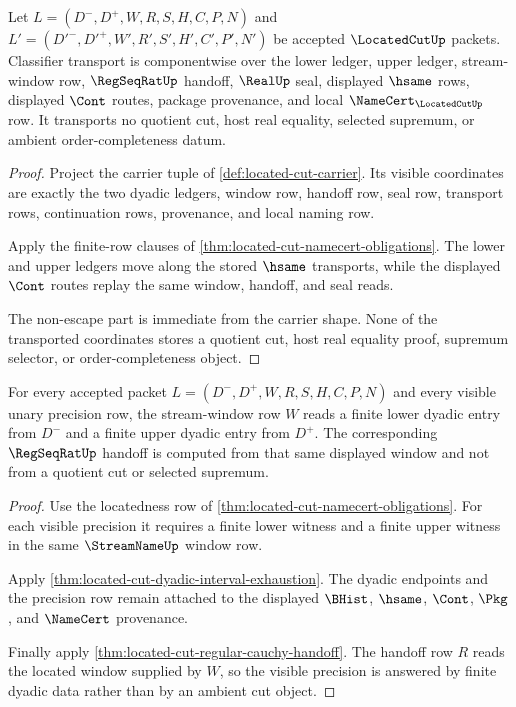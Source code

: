 \begin{theorem}
\label{thm:located-cut-classifier-transport}
Let $L=(D^{-},D^{+},W,R,S,H,C,P,N)$ and
$L'=(D'^{-},D'^{+},W',R',S',H',C',P',N')$ be accepted
$\LocatedCutUp$ packets. Classifier transport is componentwise over the lower
ledger, upper ledger, stream-window row, $\RegSeqRatUp$ handoff, $\RealUp$
seal, displayed $\hsame$ rows, displayed $\Cont$ routes, package provenance,
and local $\NameCert_{\LocatedCutUp}$ row. It transports no quotient cut,
host real equality, selected supremum, or ambient order-completeness datum.
\end{theorem}
\begin{proof}
Project the carrier tuple of \autoref{def:located-cut-carrier}. Its visible
coordinates are exactly the two dyadic ledgers, window row, handoff row, seal
row, transport rows, continuation rows, provenance, and local naming row.

Apply the finite-row clauses of
\autoref{thm:located-cut-namecert-obligations}. The lower and upper ledgers
move along the stored $\hsame$ transports, while the displayed $\Cont$ routes
replay the same window, handoff, and seal reads.

The non-escape part is immediate from the carrier shape. None of the
transported coordinates stores a quotient cut, host real equality proof,
supremum selector, or order-completeness object.
\end{proof}

\begin{theorem}
\label{thm:located-cut-located-window-exactness}
For every accepted packet $L=(D^{-},D^{+},W,R,S,H,C,P,N)$ and every visible
unary precision row, the stream-window row $W$ reads a finite lower dyadic
entry from $D^{-}$ and a finite upper dyadic entry from $D^{+}$. The
corresponding $\RegSeqRatUp$ handoff is computed from that same displayed
window and not from a quotient cut or selected supremum.
\end{theorem}
\begin{proof}
Use the locatedness row of
\autoref{thm:located-cut-namecert-obligations}. For each visible precision it
requires a finite lower witness and a finite upper witness in the same
$\StreamNameUp$ window row.

Apply \autoref{thm:located-cut-dyadic-interval-exhaustion}. The dyadic
endpoints and the precision row remain attached to the displayed $\BHist$,
$\hsame$, $\Cont$, $\Pkg$, and $\NameCert$ provenance.

Finally apply \autoref{thm:located-cut-regular-cauchy-handoff}. The handoff
row $R$ reads the located window supplied by $W$, so the visible precision is
answered by finite dyadic data rather than by an ambient cut object.
\end{proof}

